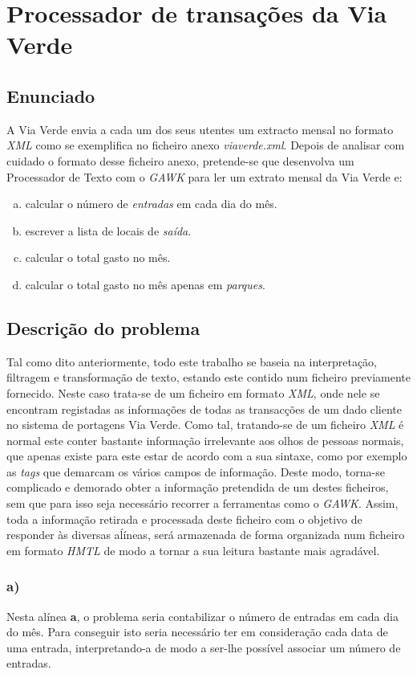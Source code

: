 \documentclass[12pt,a4paper]{report}
\begin{document}
\chapter{Processador de transações da Via Verde}
\section{Enunciado}
A Via Verde envia a cada um dos seus utentes um extracto mensal no formato \emph{XML} como se exemplifica no ficheiro anexo \emph{viaverde.xml}. Depois de analisar com cuidado o formato desse ficheiro anexo, pretende-se que desenvolva um Processador de Texto com o \emph{GAWK} para ler um extrato mensal da Via Verde e:

\begin{enumerate}[a)] 
    \item calcular o número de \emph{entradas} em cada dia do mês.
    \item escrever a lista de locais de \emph{saída}.
    \item calcular o total gasto no mês.
    \item calcular o total gasto no mês apenas em \emph{parques}.
\end{enumerate}

\section{Descrição do problema}
Tal como dito anteriormente, todo este trabalho se baseia na interpretação, filtragem e transformação de texto, estando este contido num ficheiro previamente fornecido. Neste caso trata-se de um ficheiro em formato \emph{XML}, onde nele se encontram registadas as informações de todas as transacções de um dado cliente no sistema de portagens Via Verde. Como tal, tratando-se de um ficheiro \emph{XML} é normal este conter bastante informação irrelevante aos olhos de pessoas normais, que apenas existe para este estar de acordo com a sua sintaxe, como por exemplo as \emph{tags} que demarcam os vários campos de informação. Deste modo, torna-se complicado e demorado obter a informação pretendida de um destes ficheiros, sem que para isso seja necessário recorrer a ferramentas como o \emph{GAWK}. Assim, toda a informação retirada e processada deste ficheiro com o objetivo de responder às diversas aĺíneas, será armazenada de forma organizada num ficheiro em formato \emph{HMTL} de modo a tornar a sua leitura bastante mais agradável.

\subsection{a)}
Nesta alínea \textbf{a}, o problema seria contabilizar o número de entradas em cada dia do mês. Para conseguir isto seria necessário ter em consideração cada data de uma entrada, interpretando-a de modo a ser-lhe possível associar um número de entradas.
\end{document}

